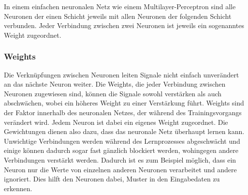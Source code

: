 In einem einfachen neuronalen Netz wie einem Multilayer-Perceptron sind alle Neuronen der einen Schicht jeweils mit allen Neuronen der folgenden Schicht verbunden.
Jeder Verbindung zwischen zwei Neuronen ist jeweils ein sogenanntes Weight zugeordnet.


\subsubsection{Weights}\label{subsec:neuronen:verknuepfung_neuronen:Weights}
  Die Verknüpfungen zwischen Neuronen leiten Signale nicht einfach unverändert an das nächste Neuron weiter.
  Die Weights, die jeder Verbindung zwischen Neuronen zugewiesen sind, können die Signale sowohl verstärken als auch abschwächen, wobei ein höheres Weight zu einer Verstärkung führt.
  Weights sind der Faktor innerhalb des neuronalen Netzes, der während des Trainingsvorgangs verändert wird.
  Jedem Neuron ist dabei ein eigenes Weight zugeordnet. Die Gewichtungen dienen also dazu, dass das neuronale Netz überhaupt lernen kann.
  Unwichtige Verbindungen werden während des Lernprozesses abgeschwächt und einige können dadurch sogar fast gänzlich blockiert werden, wohingegen andere Verbindungen verstärkt werden.
  Dadurch ist es zum Beispiel möglich, dass ein Neuron nur die Werte von einzelnen anderen Neuronen verarbeitet und andere ignoriert.
  Dies hilft den Neuronen dabei, Muster in den Eingabedaten zu erkennen. 